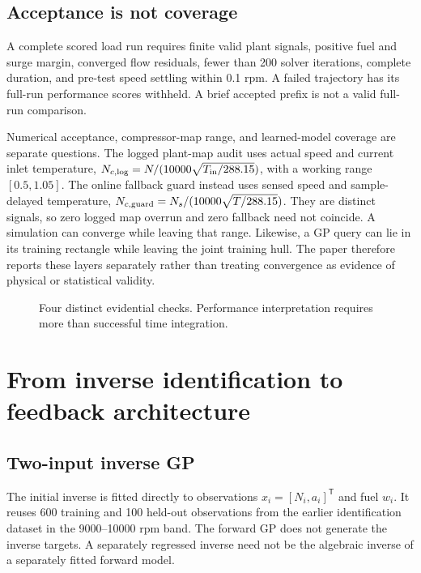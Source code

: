 \section{Acceptance is not coverage}
A complete scored load run requires finite valid plant signals, positive fuel and surge margin, converged flow residuals, fewer than 200 solver iterations, complete duration, and pre-test speed settling within 0.1 rpm. A failed trajectory has its full-run performance scores withheld. A brief accepted prefix is not a valid full-run comparison.

Numerical acceptance, compressor-map range, and learned-model coverage are separate questions. The logged plant-map audit uses actual speed and current inlet temperature,
$N_{c,\rm log}=N/(10000\sqrt{T_{\rm in}/288.15})$, with a working range $[0.5,1.05]$.
The online fallback guard instead uses sensed speed and sample-delayed temperature,
$N_{c,\rm guard}=N_s/(10000\sqrt{T/288.15})$.
They are distinct signals, so zero logged map overrun and zero fallback need not coincide. A simulation can converge while leaving that range. Likewise, a GP query can lie in its training rectangle while leaving the joint training hull. The paper therefore reports these layers separately rather than treating convergence as evidence of physical or statistical validity.
\begin{figure}[htbp]\centering\diagramEvidence
\caption{Four distinct evidential checks. Performance interpretation requires more than successful time integration.}\label{fig:evidence}\end{figure}


\chapter{From inverse identification to feedback architecture}
\section{Two-input inverse GP}
The initial inverse is fitted directly to observations $x_i=[N_i,a_i]^\mathsf T$ and fuel $w_i$. It reuses 600 training and 100 held-out observations from the earlier identification dataset in the 9000--10000 rpm band. The forward GP does not generate the inverse targets. A separately regressed inverse need not be the algebraic inverse of a separately fitted forward model.

